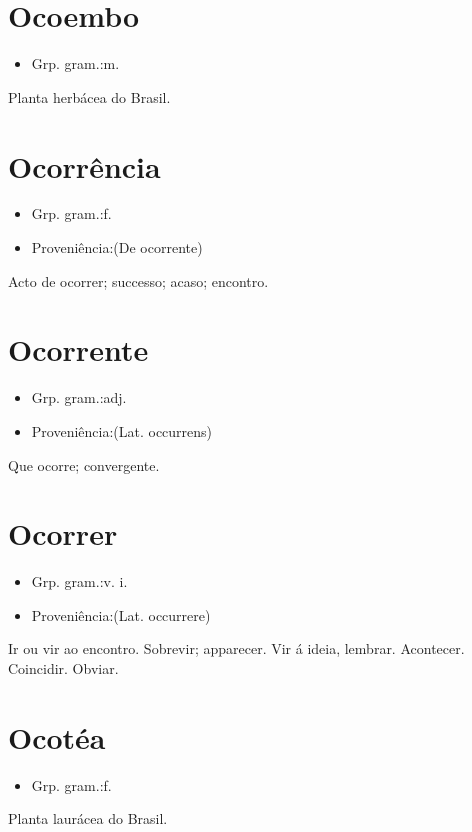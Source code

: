 \section{Ocoembo}
\begin{itemize}
\item {Grp. gram.:m.}
\end{itemize}
Planta herbácea do Brasil.
\section{Ocorrência}
\begin{itemize}
\item {Grp. gram.:f.}
\end{itemize}
\begin{itemize}
\item {Proveniência:(De \textunderscore ocorrente\textunderscore )}
\end{itemize}
Acto de ocorrer; successo; acaso; encontro.
\section{Ocorrente}
\begin{itemize}
\item {Grp. gram.:adj.}
\end{itemize}
\begin{itemize}
\item {Proveniência:(Lat. \textunderscore occurrens\textunderscore )}
\end{itemize}
Que ocorre; convergente.
\section{Ocorrer}
\begin{itemize}
\item {Grp. gram.:v. i.}
\end{itemize}
\begin{itemize}
\item {Proveniência:(Lat. \textunderscore occurrere\textunderscore )}
\end{itemize}
Ir ou vir ao encontro.
Sobrevir; apparecer.
Vir á ideia, lembrar.
Acontecer.
Coincidir.
Obviar.
\section{Ocotéa}
\begin{itemize}
\item {Grp. gram.:f.}
\end{itemize}
Planta laurácea do Brasil.
